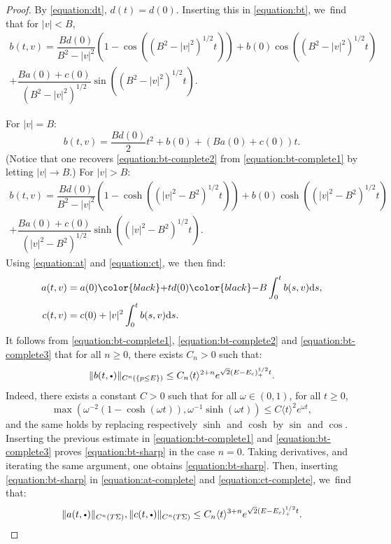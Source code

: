 \documentclass[10pt]{amsart}
\newcommand{\sbullet}{{\scriptscriptstyle\bullet}}
\newcommand{\csbullet}{{\raisebox{1pt}{$\sbullet$}}}
\theoremstyle{plain}
\theoremstyle{definition}
\newcommand{\dd}{\mathrm{d}}
\begin{document}
\begin{proof}
\noindent
\begin{minipage}{\textwidth}
By \eqref{equation:dt}, $d(t)=d(0)$. Inserting this in \eqref{equation:bt}, we~find that for $|v| < B$,
\begin{multline}
\label{equation:bt-complete1}
b(t,v) = \dfrac{Bd(0)}{B^2-|v|^2}\left(1-\cos((B^2-|v|^2)^{1/2}t) \right) + b(0) \cos((B^2-|v|^2)^{1/2}t) \\
+ \dfrac{Ba(0)+c(0)}{(B^2-|v|^2)^{1/2}} \sin((B^2-|v|^2)^{1/2}t).
\end{multline}
\end{minipage}
\par\noindent
For $|v|=B$:
\begin{equation}
\label{equation:bt-complete2}
b(t,v) = \dfrac{Bd(0)}{2} t^2 + b(0) + (Ba(0)+c(0))t.
\end{equation}
(Notice that one recovers \eqref{equation:bt-complete2} from \eqref{equation:bt-complete1} by letting $|v| \to B$.) For $|v| > B$:
\begin{multline}
\label{equation:bt-complete3}
b(t,v) = \dfrac{Bd(0)}{B^2-|v|^2}\left(1-\cosh((|v|^2-B^2)^{1/2}t) \right) + b(0) \cosh((|v|^2-B^2)^{1/2}t) \\
+ \dfrac{Ba(0)+c(0)}{(|v|^2-B^2)^{1/2}} \sinh((|v|^2-B^2)^{1/2}t).
\end{multline}
Using \eqref{equation:at} and \eqref{equation:ct}, we~then find:
\begin{align}
\label{equation:at-complete}
a(t,v) &= a(0) {\color{black}+} td(0) {\color{black}-} B\int_0^t b(s,v) \dd s, \\
\label{equation:ct-complete}
c(t,v) &= c(0) + |v|^2 \int_0^t b(s,v) \dd s.
\end{align}
It follows from \eqref{equation:bt-complete1}, \eqref{equation:bt-complete2} and \eqref{equation:bt-complete3} that for all $n \geq 0$, there exists $C_n > 0$ such that:
\begin{equation}
\label{equation:bt-sharp}
\|b(t,\csbullet)\|_{C^n(\{p \leq E\})} \leq C_n \langle t \rangle^{2+n} e^{\sqrt{2}(E-E_c)_+^{1/2}t}.
\end{equation}
Indeed, there exists a constant $C > 0$ such that for all $\omega \in (0,1)$, for all $t \geq 0$,
\[
\max\left(\omega^{-2}(1-\cosh(\omega t)), \omega^{-1}\sinh(\omega t)\right) \leq C \langle t\rangle^2 e^{\omega t},
\]
and the same holds by replacing respectively $\sinh$ and $\cosh$ by $\sin$ and $\cos$. Inserting the previous estimate in \eqref{equation:bt-complete1} and \eqref{equation:bt-complete3} proves \eqref{equation:bt-sharp} in the case $n=0$. Taking derivatives, and iterating the same argument, one obtains \eqref{equation:bt-sharp}. Then, inserting \eqref{equation:bt-sharp} in \eqref{equation:at-complete} and \eqref{equation:ct-complete}, we~find that:
\begin{equation}
\label{equation:at-ct-sharp}
\|a(t,\csbullet)\|_{C^n(T\Sigma)}, \|c(t,\csbullet)\|_{C^n(T\Sigma)} \leq C_n \langle t\rangle^{3+n} e^{\sqrt{2}(E-E_c)_+^{1/2}t}.
\end{equation}


\end{proof}
\end{document}
